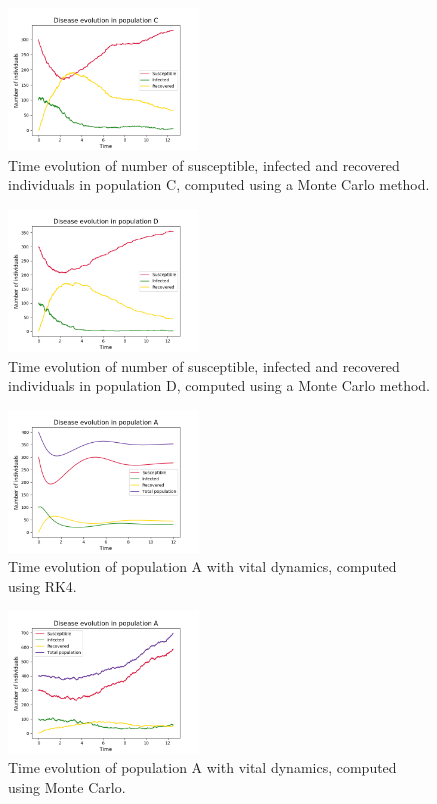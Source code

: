 \documentclass[notitlepage, reprint, nofootinbib]{revtex4-1}
\begin{document}
\begin{figure}
	\centering
	\includegraphics[width=0.45\textwidth]{../Figures/MC_population_C}
	\caption{Time evolution of number of susceptible, infected and recovered individuals in population C, computed using a Monte Carlo method.}
	\label{MC_C}
\end{figure}
\begin{figure}
	\centering
	\includegraphics[width=0.45\textwidth]{../Figures/MC_population_D}
	\caption{Time evolution of number of susceptible, infected and recovered individuals in population D, computed using a Monte Carlo method.}
	\label{MC_D}
\end{figure}
\begin{figure}
	\centering
	\includegraphics[width=0.45\textwidth]{../Figures/RK4_popA_vr}
	\caption{Time evolution of population A with vital dynamics, computed using RK4.}
	\label{RK4_vr}
\end{figure}
\begin{figure}
	\centering
	\includegraphics[width=0.45\textwidth]{../Figures/MC_popA_vr}
	\caption{Time evolution of population A with vital dynamics, computed using Monte Carlo.}
	\label{MC_vr}
\end{figure}
\end{document}
